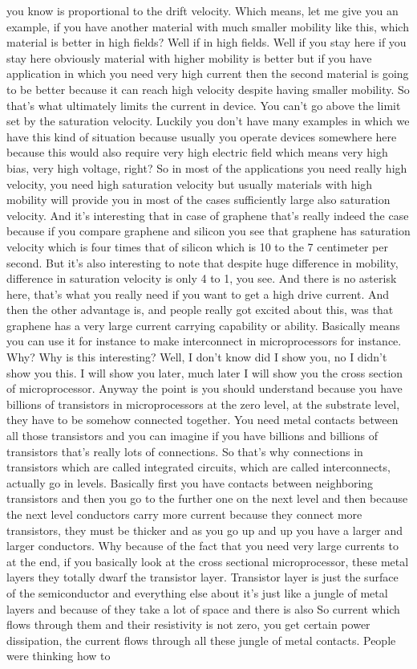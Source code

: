 you know is proportional to the drift velocity. Which means, let me give you an example, if you have another material with much smaller mobility like this, which material is better in high fields? Well if in high fields. Well if you stay here if you stay here obviously material with higher mobility is better but if you have application in which you need very high current then the second material is going to be better because it can reach high velocity despite having smaller mobility. So that's what ultimately limits the current in device. You can't go above the limit set by the saturation velocity. Luckily you don't have many examples in which we have this kind of situation because usually you operate devices somewhere here because this would also require very high electric field which means very high bias, very high voltage, right? So in most of the applications you need really high velocity, you need high saturation velocity but usually materials with high mobility will provide you in most of the cases sufficiently large also saturation velocity. And it's interesting that in case of graphene that's really indeed the case because if you compare graphene and silicon you see that graphene has saturation velocity which is four times that of silicon which is 10 to the 7 centimeter per second. But it's also interesting to note that despite huge difference in mobility, difference in saturation velocity is only 4 to 1, you see. And there is no asterisk here, that's what you really need if you want to get a high drive current. And then the other advantage is, and people really got excited about this, was that graphene has a very large current carrying capability or ability. Basically means you can use it for instance to make interconnect in microprocessors for instance. Why? Why is this interesting? Well, I don't know did I show you, no I didn't show you this. I will show you later, much later I will show you the cross section of microprocessor. Anyway the point is you should understand because you have billions of transistors in microprocessors at the zero level, at the substrate level, they have to be somehow connected together. You need metal contacts between all those transistors and you can imagine if you have billions and billions of transistors that's really lots of connections. So that's why connections in transistors which are called integrated circuits, which are called interconnects, actually go in levels. Basically first you have contacts between neighboring transistors and then you go to the further one on the next level and then because the next level conductors carry more current because they connect more transistors, they must be thicker and as you go up and up you have a larger and larger conductors. Why because of the fact that you need very large currents to at the end, if you basically look at the cross sectional microprocessor, these metal layers they totally dwarf the transistor layer. Transistor layer is just the surface of the semiconductor and everything else about it's just like a jungle of metal layers and because of they take a lot of space and there is also So current which flows through them and their resistivity is not zero, you get certain power dissipation, the current flows through all these jungle of metal contacts. People were thinking how to 